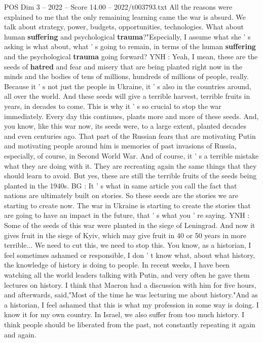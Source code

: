 \begin{textsample}{POS Dim 3 – 2022 – Score 14.00 – 2022/t003793.txt}
All the reasons were explained to me that the only remaining learning came the war is absurd.
We talk about strategy, power, budgets, opportunities, technologies.
What about human \textbf{suffering} and psychological \textbf{trauma}?"Especially, I assume what she ' s asking is what about, what ' s going to remain, in terms of the human \textbf{suffering} and the psychological \textbf{trauma} going forward?
YNH : Yeah, I mean, these are the seeds of \textbf{hatred} and fear and misery that are being planted right now in the minds and the bodies of tens of millions, hundreds of millions of people, really.
Because it ' s not just the people in Ukraine, it ' s also in the countries around, all over the world.
And these seeds will give a terrible harvest, terrible fruits in years, in decades to come.
This is why it ' s so crucial to stop the war immediately.
Every day this continues, plants more and more of these seeds.
And, you know, like this war now, its seeds were, to a large extent, planted decades and even centuries ago.
That part of the Russian fears that are motivating Putin and motivating people around him is memories of past invasions of Russia, especially, of course, in Second World War.
And of course, it ' s a terrible mistake what they are doing with it.
They are recreating again the same things that they should learn to avoid.
But yes, these are still the terrible fruits of the seeds being planted in the 1940s.
BG : It ' s what in same article you call the fact that nations are ultimately built on stories.
So these seeds are the stories we are starting to create now.
The war in Ukraine is starting to create the stories that are going to have an impact in the future, that ' s what you ' re saying.
YNH : Some of the seeds of this war were planted in the siege of Leningrad.
And now it gives fruit in the siege of Kyiv, which may give fruit in 40 or 50 years in more terrible...
We need to cut this, we need to stop this.
You know, as a historian, I feel sometimes ashamed or responsible, I don ' t know what, about what history, the knowledge of history is doing to people.
In recent weeks, I have been watching all the world leaders talking with Putin, and very often he gave them lectures on history.
I think that Macron had a discussion with him for five hours, and afterwards, said,"Most of the time he was lecturing me about history."And as a historian, I feel ashamed that this is what my profession in some way is doing.
I know it for my own country.
In Israel, we also suffer from too much history.
I think people should be liberated from the past, not constantly repeating it again and again.

\end{textsample}

